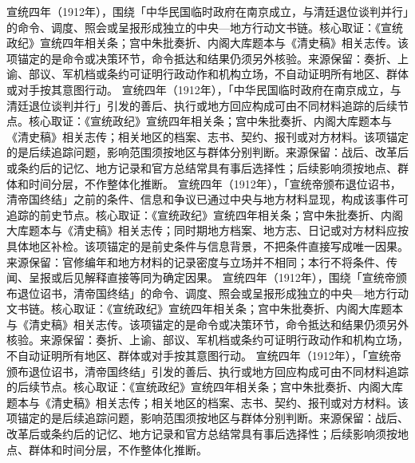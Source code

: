 宣统四年（1912年），围绕「中华民国临时政府在南京成立，与清廷退位谈判并行」的命令、调度、照会或呈报形成独立的中央—地方行动文书链。核心取证：《宣统政纪》宣统四年相关条；宫中朱批奏折、内阁大库题本与《清史稿》相关志传。该项锚定的是命令或决策环节，命令抵达和结果仍须另外核验。来源保留：奏折、上谕、部议、军机档或条约可证明行政动作和机构立场，不自动证明所有地区、群体或对手按其意图行动。
宣统四年（1912年），「中华民国临时政府在南京成立，与清廷退位谈判并行」引发的善后、执行或地方回应构成可由不同材料追踪的后续节点。核心取证：《宣统政纪》宣统四年相关条；宫中朱批奏折、内阁大库题本与《清史稿》相关志传；相关地区的档案、志书、契约、报刊或对方材料。该项锚定的是后续追踪问题，影响范围须按地区与群体分别判断。来源保留：战后、改革后或条约后的记忆、地方记录和官方总结常具有事后选择性；后续影响须按地点、群体和时间分层，不作整体化推断。
宣统四年（1912年），「宣统帝颁布退位诏书，清帝国终结」之前的条件、信息和争议已通过中央与地方材料显现，构成该事件可追踪的前史节点。核心取证：《宣统政纪》宣统四年相关条；宫中朱批奏折、内阁大库题本与《清史稿》相关志传；同时期地方档案、地方志、日记或对方材料应按具体地区补检。该项锚定的是前史条件与信息背景，不把条件直接写成唯一因果。来源保留：官修编年和地方材料的记录密度与立场并不相同；本行不将条件、传闻、呈报或后见解释直接等同为确定因果。
宣统四年（1912年），围绕「宣统帝颁布退位诏书，清帝国终结」的命令、调度、照会或呈报形成独立的中央—地方行动文书链。核心取证：《宣统政纪》宣统四年相关条；宫中朱批奏折、内阁大库题本与《清史稿》相关志传。该项锚定的是命令或决策环节，命令抵达和结果仍须另外核验。来源保留：奏折、上谕、部议、军机档或条约可证明行政动作和机构立场，不自动证明所有地区、群体或对手按其意图行动。
宣统四年（1912年），「宣统帝颁布退位诏书，清帝国终结」引发的善后、执行或地方回应构成可由不同材料追踪的后续节点。核心取证：《宣统政纪》宣统四年相关条；宫中朱批奏折、内阁大库题本与《清史稿》相关志传；相关地区的档案、志书、契约、报刊或对方材料。该项锚定的是后续追踪问题，影响范围须按地区与群体分别判断。来源保留：战后、改革后或条约后的记忆、地方记录和官方总结常具有事后选择性；后续影响须按地点、群体和时间分层，不作整体化推断。
